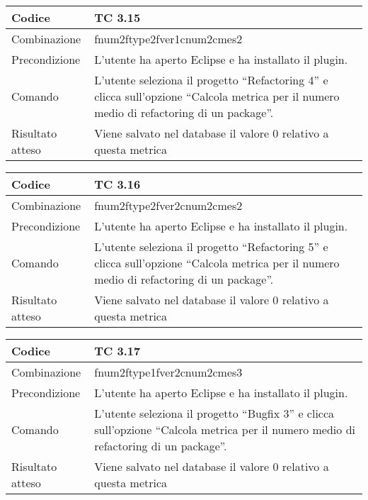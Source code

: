 \begin{table}[ht]
\begin{tabular}{|p{3cm}|p{9cm}|}
\hline
\cellcolor{lightgray}Codice				& TC 3.15								\\
\hline
\cellcolor{lightgray}Combinazione		& fnum2ftype2fver1cnum2cmes2  									\\
\hline
\cellcolor{lightgray}Precondizione		& L'utente ha aperto Eclipse e ha installato il plugin.			\\
\hline
\cellcolor{lightgray}Comando			& L'utente seleziona il progetto ``Refactoring 4''  e clicca sull'opzione 
``Calcola metrica per il numero medio di refactoring di un package''.	\\
\hline
\cellcolor{lightgray}Risultato atteso	& Viene salvato nel database il valore 0 relativo a questa metrica	\\
\hline
\end{tabular}
\end{table}

\begin{table}[ht]
\begin{tabular}{|p{3cm}|p{9cm}|}
\hline
\cellcolor{lightgray}Codice				& TC 3.16								\\
\hline
\cellcolor{lightgray}Combinazione		& fnum2ftype2fver2cnum2cmes2 									\\
\hline
\cellcolor{lightgray}Precondizione		& L'utente ha aperto Eclipse e ha installato il plugin.				\\
\hline
\cellcolor{lightgray}Comando			& L'utente seleziona il progetto ``Refactoring 5''  e clicca sull'opzione ``Calcola metrica per il numero medio di refactoring di un package''.	\\
\hline
\cellcolor{lightgray}Risultato atteso	& Viene salvato nel database il valore 0 relativo a questa metrica	\\
\hline
\end{tabular}
\end{table}

\begin{table}[ht]
\begin{tabular}{|p{3cm}|p{9cm}|}
\hline
\cellcolor{lightgray}Codice				& TC 3.17								\\
\hline
\cellcolor{lightgray}Combinazione		& fnum2ftype1fver2cnum2cmes3 								\\
\hline
\cellcolor{lightgray}Precondizione		& L'utente ha aperto Eclipse e ha installato il plugin.									\\
\hline
\cellcolor{lightgray}Comando			& L'utente seleziona il progetto ``Bugfix 3''  e clicca sull'opzione ``Calcola metrica per il numero medio di refactoring di un package''.	\\
\hline
\cellcolor{lightgray}Risultato atteso	& Viene salvato nel database il valore 0 relativo a questa metrica	\\
\hline
\end{tabular}
\end{table}


